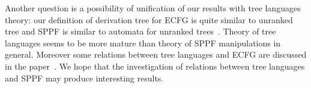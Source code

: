 \documentclass[runningheads,a4paper]{llncs}
\begin{document}
Another question is a possibility of unification of our results with tree languages theory: our definition of derivation tree for ECFG is quite similar to unranked tree and SPPF is similar to automata for unranked trees~\cite{TATA}.
Theory of tree languages seems to be more mature than theory of SPPF manipulations in general.
Moreover some relations between tree languages and ECFG are discussed in the paper~\cite{TreeLangAndECFG}.
We hope that the investigation of relations between tree languages and SPPF may produce interesting results.





\end{document}
